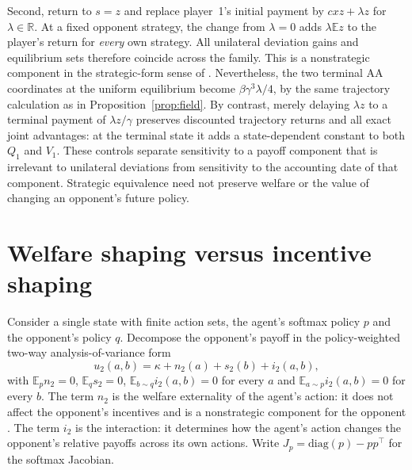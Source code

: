 \documentclass[11pt]{article}
\theoremstyle{remark}
\newcommand{\E}{\mathbb{E}}
\begin{document}
Second, return to $s=z$ and replace player~1's initial payment by $cxz+\lambda z$ for $\lambda\in\mathbb{R}$. At a fixed opponent strategy, the change from $\lambda=0$ adds $\lambda\E z$ to the player's return for \emph{every} own strategy. All unilateral deviation gains and equilibrium sets therefore coincide across the family. This is a nonstrategic component in the strategic-form sense of \citet{candogan2011}. Nevertheless, the two terminal AA coordinates at the uniform equilibrium become $\beta\gamma^3\lambda/4$, by the same trajectory calculation as in Proposition~\ref{prop:field}. By contrast, merely delaying $\lambda z$ to a terminal payment of $\lambda z/\gamma$ preserves discounted trajectory returns and all exact joint advantages: at the terminal state it adds a state-dependent constant to both $Q_1$ and $V_1$. These controls separate sensitivity to a payoff component that is irrelevant to unilateral deviations from sensitivity to the accounting date of that component. Strategic equivalence need not preserve welfare or the value of changing an opponent's future policy.

\section{Welfare shaping versus incentive shaping}\label{sec:welfare}

Consider a single state with finite action sets, the agent's softmax policy $p$ and the opponent's policy $q$. Decompose the opponent's payoff in the policy-weighted two-way analysis-of-variance form
\[
u_2(a,b)=\kappa+n_2(a)+s_2(b)+i_2(a,b),
\]
with $\E_p n_2=0$, $\E_q s_2=0$, $\E_{b\sim q}i_2(a,b)=0$ for every $a$ and $\E_{a\sim p}i_2(a,b)=0$ for every $b$. The term $n_2$ is the welfare externality of the agent's action: it does not affect the opponent's incentives and is a nonstrategic component for the opponent \citep{candogan2011}. The term $i_2$ is the interaction: it determines how the agent's action changes the opponent's relative payoffs across its own actions. Write $J_p=\mathrm{diag}(p)-pp^\top$ for the softmax Jacobian.
\end{document}
